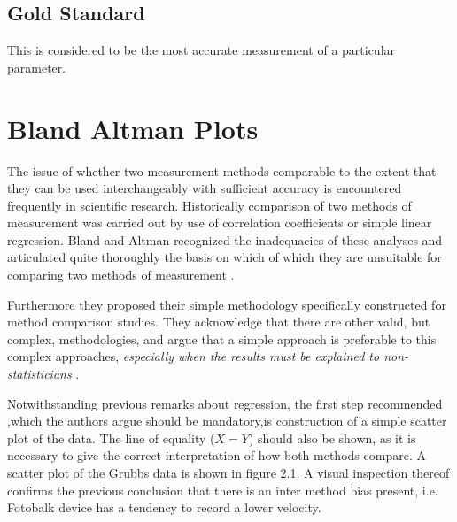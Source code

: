 \documentclass[12pt, a4paper]{report}
\theoremstyle{plain}
\theoremstyle{definition}
\theoremstyle{remark}
\begin{document}
	
	\subsection{Gold Standard} This is considered to be the most
	accurate measurement of a particular parameter.
	
	\section{Bland Altman Plots}
	The issue of whether two measurement methods comparable to the
	extent that they can be used interchangeably with sufficient
	accuracy is encountered frequently in scientific research.
	Historically comparison of two methods of measurement was carried
	out by use of correlation coefficients or simple linear
	regression. Bland and Altman recognized the inadequacies of these
	analyses and articulated quite thoroughly the basis on which of
	which they are unsuitable for comparing two methods of measurement
	\citep*{BA83}.
	
	
	Furthermore they proposed their simple methodology specifically
	constructed for method comparison studies. They acknowledge that
	there are other valid, but complex, methodologies, and argue that
	a simple approach is preferable to this complex approaches,
	\emph{especially when the results must be explained to
		non-statisticians} \citep*{BA83}.
	
	\smallskip
	
	Notwithstanding previous remarks about regression, the first step
	recommended ,which the authors argue should be mandatory,is
	construction of a simple scatter plot of the data. The line of
	equality ($X=Y$) should also be shown, as it is necessary to give
	the correct interpretation of how both methods compare. A scatter
	plot of the Grubbs data is shown in figure 2.1. A visual
	inspection thereof confirms the previous conclusion that there is
	an inter method bias present, i.e. Fotobalk device has a tendency
	to record a lower velocity.
	
\end{document}
